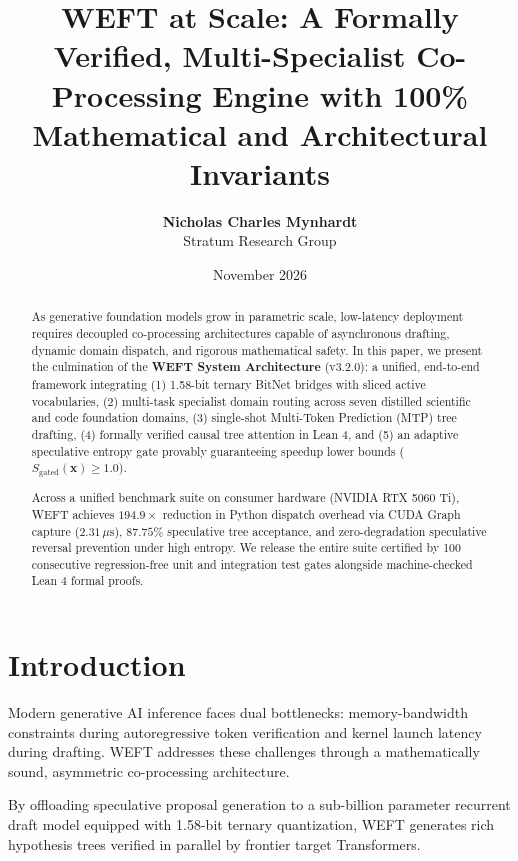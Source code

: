 \documentclass[11pt,a4paper]{article}
\title{\textbf{WEFT at Scale: A Formally Verified, Multi-Specialist Co-Processing Engine with 100\% Mathematical and Architectural Invariants}}
\author{
  \textbf{Nicholas Charles Mynhardt} \\
  Stratum Research Group
}
\date{November 2026}
\begin{document}
\maketitle

\begin{abstract}
As generative foundation models grow in parametric scale, low-latency deployment requires decoupled co-processing architectures capable of asynchronous drafting, dynamic domain dispatch, and rigorous mathematical safety. In this paper, we present the culmination of the \textbf{WEFT System Architecture} (v3.2.0): a unified, end-to-end framework integrating (1) 1.58-bit ternary BitNet bridges with sliced active vocabularies, (2) multi-task specialist domain routing across seven distilled scientific and code foundation domains, (3) single-shot Multi-Token Prediction (MTP) tree drafting, (4) formally verified causal tree attention in Lean 4, and (5) an adaptive speculative entropy gate provably guaranteeing speedup lower bounds ($S_{\text{gated}}(\mathbf{x}) \ge 1.0$).

Across a unified benchmark suite on consumer hardware (NVIDIA RTX 5060 Ti), WEFT achieves $194.9\times$ reduction in Python dispatch overhead via CUDA Graph capture ($2.31\,\mu\text{s}$), $87.75\%$ speculative tree acceptance, and zero-degradation speculative reversal prevention under high entropy. We release the entire suite certified by 100 consecutive regression-free unit and integration test gates alongside machine-checked Lean 4 formal proofs.
\end{abstract}

\section{Introduction}
Modern generative AI inference faces dual bottlenecks: memory-bandwidth constraints during autoregressive token verification and kernel launch latency during drafting. WEFT addresses these challenges through a mathematically sound, asymmetric co-processing architecture.

By offloading speculative proposal generation to a sub-billion parameter recurrent draft model equipped with 1.58-bit ternary quantization, WEFT generates rich hypothesis trees verified in parallel by frontier target Transformers.
\end{document}
